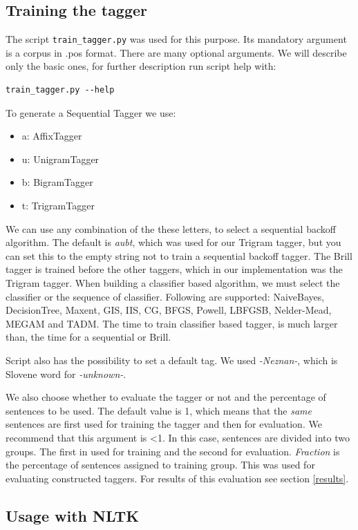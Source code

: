 \documentclass[10pt, conference, compsocconf]{IEEEtran}
\begin{document}
\subsection{Training the tagger} %
The script \texttt{train\_tagger.py} was used for this purpose. Its mandatory argument is a corpus in .pos format. There are many optional arguments. We will describe only the basic ones, for further description run script help with:
\begin{lstlisting}
train_tagger.py --help
\end{lstlisting}
\par
To generate a Sequential Tagger we use:
\begin{itemize}
\item a: AffixTagger
\item u: UnigramTagger
\item b: BigramTagger
\item t: TrigramTagger
\end{itemize}
We can use any combination of the these letters, to select a sequential backoff algorithm.
The default is \textit{aubt}, which was used for our Trigram tagger, but you can set this to the empty string not to train a sequential backoff tagger. The Brill tagger is trained before the other taggers, which in our implementation was the Trigram tagger. When building a classifier based algorithm, we must select the classifier or the sequence of classifier. Following are supported: NaiveBayes, DecisionTree, Maxent, GIS, IIS, CG, BFGS, Powell, LBFGSB, Nelder-Mead, MEGAM and TADM. The time to train classifier based tagger, is much larger than, the time for a sequential or Brill.
\par
Script also has the possibility to set a default tag. We used \textit{-Neznan-}, which is Slovene word for \textit{-unknown-}.
\par
We also choose whether to evaluate the tagger or not and the percentage of sentences to be used. The default value is 1, which means that the \textit{same} sentences are first used for training the tagger and then for evaluation. We recommend that this argument is <1. In this case, sentences are divided into two groups. The first in used for training and the second for evaluation. \textit{Fraction} is the percentage of sentences assigned to training group. 
This was used for evaluating constructed taggers. For results of this evaluation see section \ref{results}.

\subsection{Usage with NLTK} %
\end{document}
